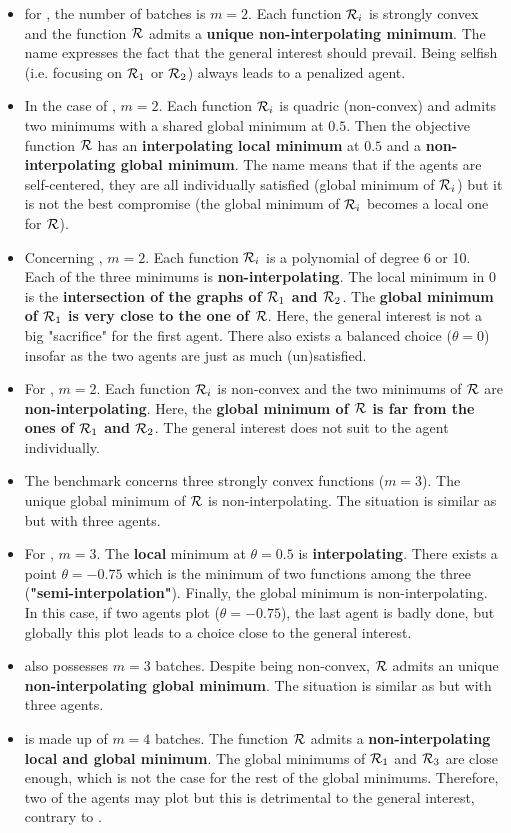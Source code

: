 \begin{itemize}
	\item for \exOne, the number of batches is $m=2$. Each function $\mathcal{R}_i$ is strongly convex and the function $\mathcal{R}$ admits a \textbf{unique non-interpolating minimum}. The name
          expresses the fact that the general interest should prevail. 
          Being selfish (i.e. focusing on $\mathcal{R}_1$ or $\mathcal{R}_2$)  always leads to a penalized agent.
	\item In the case of \exTwo, $m=2$. Each function $\mathcal{R}_i$ is quadric (non-convex) and admits two minimums with a shared global minimum at $0.5$. Then the objective function
          $\mathcal{R}$ has an \textbf{interpolating local minimum} at $0.5$ and a \textbf{non-interpolating global minimum}. The name means that if the agents are self-centered, they are all individually satisfied (global minimum of $\mathcal{R}_i$) but it is not the best compromise (the global minimum of $\mathcal{R}_i$ becomes a local one for $\mathcal{R}$).
	\item Concerning \exThree, $m=2$. Each function $\mathcal{R}_i$ is a polynomial of degree 6 or 10. Each of the three minimums is \textbf{non-interpolating}. The local minimum in 0
          is the \textbf{intersection of the graphs of $\mathcal{R}_1$ and $\mathcal{R}_2$}. The \textbf{global minimum of $\mathcal{R}_1$ is very close to the one of $\mathcal{R}$}. Here, the general interest is not a big "sacrifice" for the first agent. There also exists a balanced choice ($\theta=0$) insofar as the two agents are just as much (un)satisfied. 
	\item For \exFour, $m=2$. Each function $\mathcal{R}_i$ is non-convex and the two minimums of $\mathcal{R}$ are \textbf{non-interpolating}. Here, the \textbf{global minimum of $\mathcal{R}$ is far from the ones of $\mathcal{R}_1$ and $\mathcal{R}_2$}. The general interest does not suit to the agent individually. 
	\item The benchmark \exFive concerns three strongly convex functions ($m=3$). The unique global minimum of $\mathcal{R}$ is non-interpolating. The situation is similar as \exOne but with three agents.
	\item For \exSix, $m=3$. The \textbf{local} minimum at $\theta=0.5$ is \textbf{interpolating}. There exists a point $\theta=-0.75$ which is the minimum of two functions among the three (\textbf{"semi-interpolation"}). Finally, the global minimum is non-interpolating. In this case, if two agents plot ($\theta=-0.75$), the last agent is badly done, but globally this plot leads to a choice close to the general interest. 
	\item \exSeven also possesses $m=3$ batches. Despite being non-convex, $\mathcal{R}$ admits an unique \textbf{non-interpolating global minimum}. The situation is similar as \exFour but with three agents.
	\item \exHeight is made up of $m=4$ batches. The function $\mathcal{R}$ admits a \textbf{non-interpolating local and global minimum}. The global minimums of $\mathcal{R}_1$ and $\mathcal{R}_3$ are close enough, which is not the case for the rest of the global minimums. Therefore, two of the agents may plot but this is detrimental to the general interest, contrary to \exSix.      
\end{itemize}

